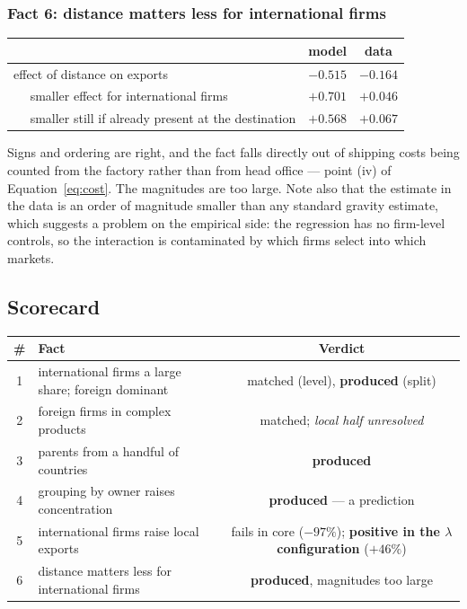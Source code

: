 \documentclass[11pt]{article}
\theoremstyle{plain}
\theoremstyle{remark}
\theoremstyle{definition}
\begin{document}
\subsubsection{Fact 6: distance matters less for international firms}

\begin{center}
\begin{tabular}{lcc}
\toprule
 & model & data\\
\midrule
effect of distance on exports & $-0.515$ & $-0.164$\\
$\quad$ smaller effect for international firms & $+0.701$ & $+0.046$\\
$\quad$ smaller still if already present at the destination & $+0.568$ & $+0.067$\\
\bottomrule
\end{tabular}
\end{center}

Signs and ordering are right, and the fact falls directly out of shipping costs being
counted from the factory rather than from head office --- point (iv) of
Equation~\eqref{eq:cost}. The magnitudes are too large. Note also that the estimate in
the data is an order of magnitude smaller than any standard gravity estimate, which
suggests a problem on the empirical side: the regression has no firm-level controls, so
the interaction is contaminated by which firms select into which markets.

\subsection{Scorecard}

\begin{center}
\begin{tabular}{clc}
\toprule
\# & Fact & Verdict\\
\midrule
1 & international firms a large share; foreign dominant & matched (level), \textbf{produced} (split)\\
2 & foreign firms in complex products & matched; \emph{local half unresolved}\\
3 & parents from a handful of countries & \textbf{produced}\\
4 & grouping by owner raises concentration & \textbf{produced} --- a prediction\\
5 & international firms raise local exports & fails in core ($-97\%$); \textbf{positive in the $\lambda$ configuration} ($+46\%$)\\
6 & distance matters less for international firms & \textbf{produced}, magnitudes too large\\
\bottomrule
\end{tabular}
\end{center}
\end{document}
